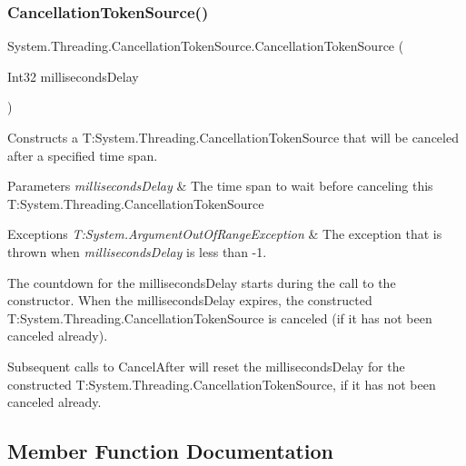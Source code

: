 \subsubsection{\texorpdfstring{Cancellation\+Token\+Source()}{CancellationTokenSource()}\hspace{0.1cm}{\footnotesize\ttfamily [3/3]}}
{\footnotesize\ttfamily System.\+Threading.\+Cancellation\+Token\+Source.\+Cancellation\+Token\+Source (\begin{DoxyParamCaption}\item[{Int32}]{milliseconds\+Delay }\end{DoxyParamCaption})\hspace{0.3cm}{\ttfamily [inline]}}



Constructs a T\+:\+System.\+Threading.\+Cancellation\+Token\+Source that will be canceled after a specified time span. 


\begin{DoxyParams}{Parameters}
{\em milliseconds\+Delay} & The time span to wait before canceling this T\+:\+System.\+Threading.\+Cancellation\+Token\+Source\\
\hline
\end{DoxyParams}

\begin{DoxyExceptions}{Exceptions}
{\em T\+:\+System.\+Argument\+Out\+Of\+Range\+Exception} & The exception that is thrown when {\itshape milliseconds\+Delay}  is less than -\/1. \\
\hline
\end{DoxyExceptions}


The countdown for the milliseconds\+Delay starts during the call to the constructor. When the milliseconds\+Delay expires, the constructed T\+:\+System.\+Threading.\+Cancellation\+Token\+Source is canceled (if it has not been canceled already). 

Subsequent calls to Cancel\+After will reset the milliseconds\+Delay for the constructed T\+:\+System.\+Threading.\+Cancellation\+Token\+Source, if it has not been canceled already. 

\subsection{Member Function Documentation}
\mbox{\label{class_system_1_1_threading_1_1_cancellation_token_source_a1c5aa6f903b7d50df87b7969f9ad10da}} 
